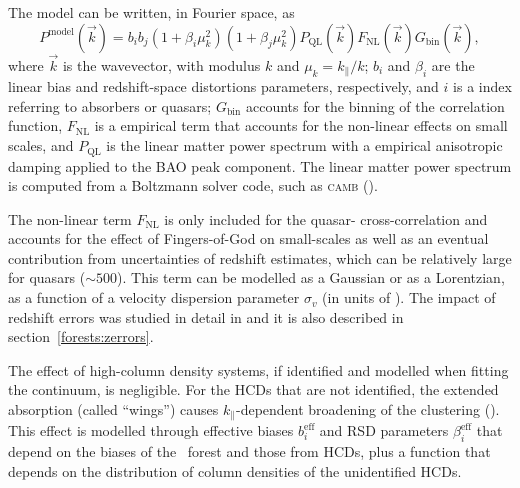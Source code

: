 The model can be written, in Fourier space, as 
\begin{equation}
    P^\mathrm{model}(\vec{k}) = b_i b_j 
        \left(1+\beta_i \mu^2_k\right) \left(1+\beta_j \mu^2_k\right) 
        P_\mathrm{ QL}(\vec{k}) F_\mathrm{NL}(\vec{k})G_\mathrm{ bin}(\vec{k}), 
    \label{eq:power_spectrum}
\end{equation}
where $\vec{k}$ is the wavevector, with modulus $k$ and $\mu_k = k_\parallel/k$;
$b_i$ and $\beta_i$ are the linear bias and redshift-space distortions parameters, respectively,
and $i$ is a index referring to absorbers or quasars; 
$G_\mathrm{ bin}$ accounts for the binning of the correlation function, 
$F_\mathrm{NL}$ is a empirical term that accounts for the non-linear effects on small scales, 
and $ P_\mathrm{ QL}$ is the linear matter power spectrum with a empirical anisotropic 
damping applied to the BAO peak component. 
The linear matter power spectrum is computed from a Boltzmann solver code, 
such as \textsc{camb} (\cite{lewisEfficientComputationCosmic2000}). 

The non-linear term $F_\mathrm{NL}$ is only included for the quasar-\lya 
cross-correlation and accounts for the effect of Fingers-of-God on small-scales as well as 
an eventual contribution from uncertainties of redshift estimates,
which can be relatively large for quasars ($\sim 500$\kms). 
This term can be modelled as a Gaussian or as a Lorentzian, as a function of a 
velocity dispersion parameter $\sigma_v$ (in units of \kms).
The impact of redshift errors was studied in detail in 
\cite{youlesEffectQuasarRedshift2022a} and it is also described in 
section~\ref{forests:zerrors}.

The effect of high-column density systems, if identified and modelled 
when fitting the continuum, is negligible. For the HCDs that are 
not identified, the extended absorption (called ``wings'') causes 
$k_\parallel$-dependent broadening of the clustering 
(\cite{font-riberaEffectHighColumn2012,
rogersCorrelationsThreedimensionalLymanalpha2018}). 
This effect is modelled through effective biases $b_i^\mathrm{eff}$ 
and RSD parameters $\beta_i^\mathrm{eff}$ that depend on the 
biases of the \lya\ forest and those from HCDs, plus a function 
that depends on the distribution of column densities of the unidentified 
HCDs. 

